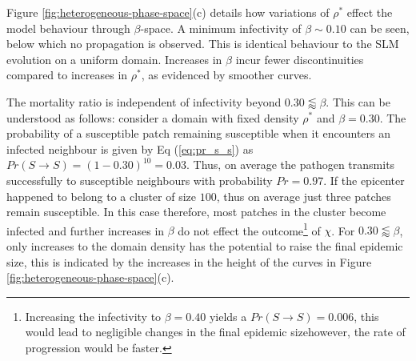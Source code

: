 Figure \ref{fig:heterogeneous-phase-space}(c) details how variations of $\rho^*$ effect the model behaviour through $\beta$-space. %
A minimum infectivity of $\beta\sim0.10$ can be seen, below which no propagation is observed. %
This is identical behaviour to the SLM evolution on a uniform domain. %
Increases in $\beta$ incur fewer discontinuities compared to increases in $\rho^*$, as evidenced by smoother curves. %

The mortality ratio is independent of infectivity beyond $0.30 \lessapprox \beta$. %
This can be understood as follows: consider a domain with fixed density $\rho^*$ and $\beta=0.30$. %
The probability of a susceptible patch remaining susceptible when it encounters an infected neighbour is given by Eq (\ref{eq:pr_s_s}) as $Pr(S \rightarrow S) = (1 - 0.30)^{10} = 0.03$. %
Thus, on average the pathogen transmits successfully to susceptible neighbours with probability $Pr=0.97$. %
If the epicenter happened to belong to a cluster of size $100$, thus on average just three patches remain susceptible. %
In this case therefore, most patches in the cluster become infected and further increases in $\beta$ do not effect the %
outcome\footnote{Increasing the infectivity to $\beta=0.40$ yields a $Pr(S \rightarrow S) = 0.006$, this would lead to negligible changes in the final epidemic size\textemdash however, the rate of progression would be faster.} of $\chi$. %
For $0.30 \lessapprox  \beta$, only increases to the domain density has the potential to raise the final epidemic size, %
this is indicated by the increases in the height of the curves in Figure \ref{fig:heterogeneous-phase-space}(c). %

